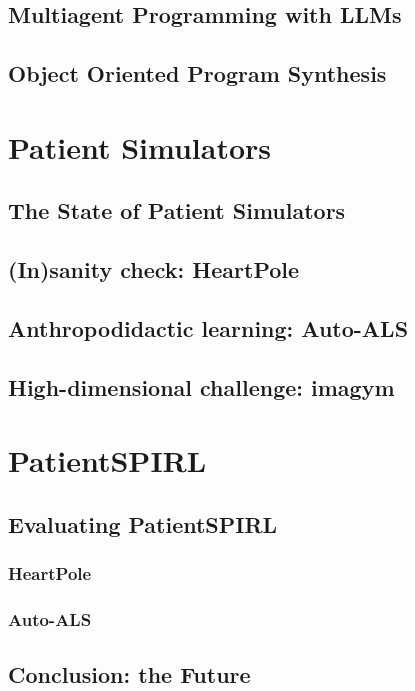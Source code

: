 \newpage
\chapter{Multiagent Programming with LLMs}
\label{ch:seidr}
%

\newpage
\chapter{Object Oriented Program Synthesis}
\label{ch:oops}

\part{Patient Simulators}
\label{part:simulators}

\newpage
\chapter{The State of Patient Simulators}
\label{ch:simulators-sota}

\newpage
\chapter{(In)sanity check: HeartPole}
\label{ch:heartpole}

\newpage
\chapter{Anthropodidactic learning: Auto-ALS}
\label{ch:auto-als}

\newpage
\chapter{High-dimensional challenge: imagym}
\label{ch:imagym}

\newpage


\part{PatientSPIRL}
\label{part:patientspirl}

\newpage
\chapter{Evaluating PatientSPIRL}
\label{ch:eval}

\section{HeartPole}

\section{Auto-ALS}

\newpage
\chapter{Conclusion: the Future}
\label{ch:conclusion}

\printbibliography


